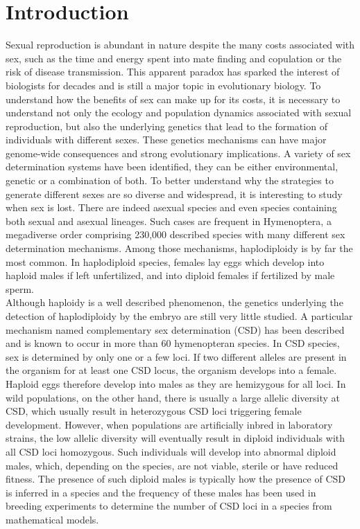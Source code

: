 \documentclass[11pt,a4paper]{report}
\begin{document}
\section*{Introduction}
Sexual reproduction is abundant in nature despite the many costs associated with sex, such as the time and energy spent into mate finding and copulation or the risk of disease transmission. This apparent paradox has sparked the interest of biologists for decades and is still a major topic in evolutionary biology. To understand how the benefits of sex can make up for its costs, it is necessary to understand not only the ecology and population dynamics associated with sexual reproduction, but also the underlying genetics that lead to the formation of individuals with different sexes. These genetics mechanisms can have major genome-wide consequences and strong evolutionary implications. A variety of sex determination systems have been identified, they can be either environmental, genetic or a combination of both. To better understand why the strategies to generate different sexes are so diverse and widespread, it is interesting to study when sex is lost. There are indeed asexual species and even species containing both sexual and asexual lineages. Such cases are frequent in Hymenoptera, a megadiverse order comprising 230,000 described species with many different sex determination mechanisms. Among those mechanisms, haplodiploidy is by far the most common. In haplodiploid species, females lay eggs which develop into haploid males if left unfertilized, and into diploid females if fertilized by male sperm. \\
Although haploidy is a well described phenomenon, the genetics underlying the detection of haplodiploidy by the embryo are still very little studied. A particular mechanism named complementary sex determination (CSD) has been described and is known to occur in more than 60 hymenopteran species. In CSD species, sex is determined by only one or a few loci. If two different alleles are present in the organism for at least one CSD locus, the organism develops into a female. Haploid eggs therefore develop into males as they are hemizygous for all loci. In wild populations, on the other hand, there is usually a large allelic diversity at CSD, which usually result in heterozygous CSD loci triggering female development. However, when populations are artificially inbred in laboratory strains, the low allelic diversity will eventually result in diploid individuals with all CSD loci homozygous. Such individuals will develop into abnormal diploid males, which, depending on the species, are not viable, sterile or have reduced fitness. The presence of such diploid males is typically how the presence of CSD is inferred in a species and the frequency of these males has been used in breeding experiments to determine the number of CSD loci in a species from mathematical models.\\
\end{document}
